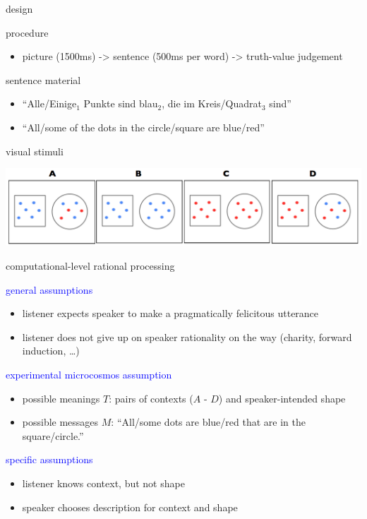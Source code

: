 \documentclass[ignorenonframetext,]{beamer}
\providecommand{\tightlist}{%
\setlength{\itemsep}{0pt}\setlength{\parskip}{0pt}}
\newcommand{\States}{\ensuremath{T}\xspace}		%
\newcommand{\Messgs}{\ensuremath{M}\xspace}		%
\begin{document}
\begin{frame}{design}

{procedure}

\begin{itemize}
\tightlist
\item
  picture (1500ms) -\textgreater{} sentence (500ms per word)
  -\textgreater{} truth-value judgement
\end{itemize}

{ sentence material }

\begin{itemize}
\tightlist
\item
  ``Alle/Einige\(_1\) Punkte sind blau\(_2\), die im Kreis/Quadrat\(_3\)
  sind''
\item
  ``All/some of the dots in the circle/square are blue/red''
\end{itemize}

{visual stimuli}

\begin{center}
\includegraphics[width = \textwidth]{pics/Augurzky_stimuli.png}
\end{center}

\end{frame}

\begin{frame}{computational-level rational processing}

\textcolor{blue}{general assumptions}

\begin{itemize}
\tightlist
\item
  listener expects speaker to make a pragmatically felicitous utterance
\item
  listener does not give up on speaker rationality on the way (charity,
  forward induction, \ldots{})
\end{itemize}

\textcolor{blue}{experimental microcosmos assumption}

\begin{itemize}
\tightlist
\item
  possible meanings \(\States\): pairs of contexts (\(A\) - \(D\)) and
  speaker-intended shape
\item
  possible messages \(\Messgs\): ``All/some dots are blue/red that are
  in the square/circle.''
\end{itemize}

\textcolor{blue}{specific assumptions}

\begin{itemize}
\tightlist
\item
  listener knows context, but not shape
\item
  speaker chooses description for context and shape
\end{itemize}

\end{frame}
\end{document}
